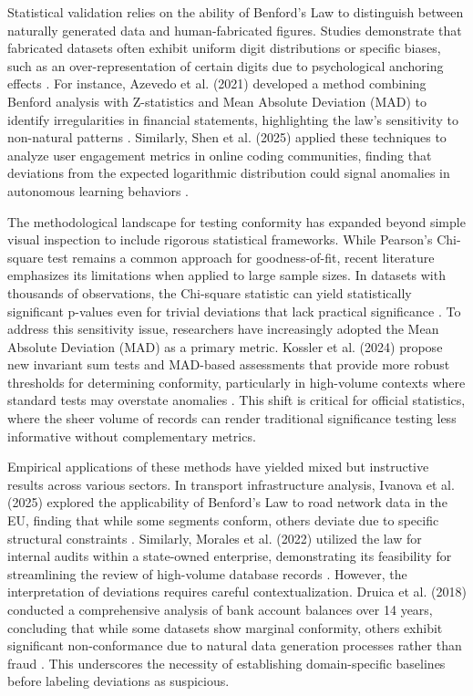 \documentclass[11pt,a4paper]{article}
\begin{document}
Statistical validation relies on the ability of Benford's Law to distinguish between naturally generated data and human-fabricated figures. Studies demonstrate that fabricated datasets often exhibit uniform digit distributions or specific biases, such as an over-representation of certain digits due to psychological anchoring effects \cite{Petras2025DetectingBL}. For instance, Azevedo et al. (2021) developed a method combining Benford analysis with Z-statistics and Mean Absolute Deviation (MAD) to identify irregularities in financial statements, highlighting the law's sensitivity to non-natural patterns \cite{Azevedo2021ABL}. Similarly, Shen et al. (2025) applied these techniques to analyze user engagement metrics in online coding communities, finding that deviations from the expected logarithmic distribution could signal anomalies in autonomous learning behaviors \cite{Shen2025AutonomousLB}.

The methodological landscape for testing conformity has expanded beyond simple visual inspection to include rigorous statistical frameworks. While Pearson's Chi-square test remains a common approach for goodness-of-fit, recent literature emphasizes its limitations when applied to large sample sizes. In datasets with thousands of observations, the Chi-square statistic can yield statistically significant p-values even for trivial deviations that lack practical significance \cite{Cerqueti2021SomeNT}. To address this sensitivity issue, researchers have increasingly adopted the Mean Absolute Deviation (MAD) as a primary metric. Kossler et al. (2024) propose new invariant sum tests and MAD-based assessments that provide more robust thresholds for determining conformity, particularly in high-volume contexts where standard tests may overstate anomalies \cite{Kossler2024SomeNI}. This shift is critical for official statistics, where the sheer volume of records can render traditional significance testing less informative without complementary metrics.

Empirical applications of these methods have yielded mixed but instructive results across various sectors. In transport infrastructure analysis, Ivanova et al. (2025) explored the applicability of Benford's Law to road network data in the EU, finding that while some segments conform, others deviate due to specific structural constraints \cite{Ivanova2025BenfordsLA}. Similarly, Morales et al. (2022) utilized the law for internal audits within a state-owned enterprise, demonstrating its feasibility for streamlining the review of high-volume database records \cite{Morales2022BenfordsLF}. However, the interpretation of deviations requires careful contextualization. Druica et al. (2018) conducted a comprehensive analysis of bank account balances over 14 years, concluding that while some datasets show marginal conformity, others exhibit significant non-conformance due to natural data generation processes rather than fraud \cite{Druica2018BenfordsLA}. This underscores the necessity of establishing domain-specific baselines before labeling deviations as suspicious.
\end{document}
